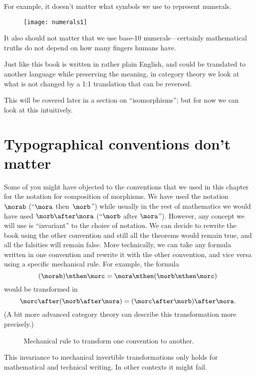 For example, it doesn't matter what symbols we use to represent numerals.
%
\begin{figure}[h!]
    \texttt{[image: numerals1]}
\end{figure}
%
It also should not matter that we use base-10 numerals---certainly mathematical truths do not depend on how many fingers humans have.

Just like this book is written in rather plain English, and could be translated to another language while preserving the meaning, in category theory we look at what is not changed by a 1:1 translation that can be reversed.

This will be covered later in a section on ``isomorphisms''; but for now we can look at this intuitively.

\section[Typographical conventions]{Typographical conventions don't matter}

Some of you might have objected to the conventions that we used in this chapter for the notation for composition of morphisms.
We have used the notation $\morab$ (``$\mora$ then~$\morb$'') while usually in the rest of mathematics we would have used $\morb \after \mora$ (``$\morb$ after $\mora$'').
However, any concept we will use is ``invariant'' to the choice of notation.
We can decide to rewrite the book using the other convention and still all the theorems would remain true, and all the falsities will remain false.
More technically, we can take any formula written in one convention and rewrite it with the other convention, and vice versa using a specific mechanical rule.
For example, the formula
%
\begin{equation}
    (\morab)
    \mthen \morc = \mora \mthen (\morb \mthen \morc)
\end{equation}
%
would be transformed in
%
\begin{equation}
    \morc \after (\morb \after \mora) = (\morc \after \morb) \after \mora.
\end{equation}
(A bit more advanced category theory can describe this transformation more precisely.)

\begin{figure*}[h]
    \hfill
    \caption{Mechanical rule to transform one convention to another.}
\end{figure*}

\vfill\clearpage
This invariance to mechanical invertible transformations only holds for mathematical and technical writing.
In other contexts it might fail.

